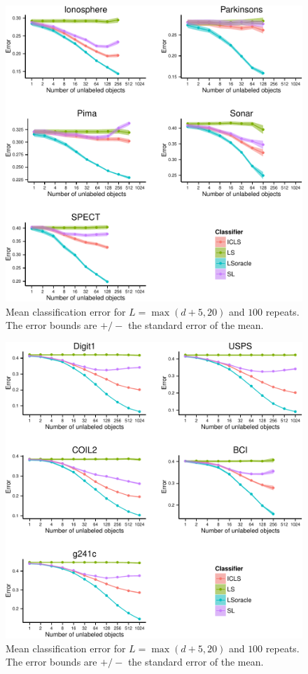 \documentclass{llncs}
\newcommand{\featdim}{d}
\newcommand{\Nlab}{L}
\begin{document}
\begin{figure}[ht!] 
  \centering
      \includegraphics[width=1.0\textwidth]{LearningCurves-1.pdf}
  \caption{Mean classification error for $\Nlab=\max(\featdim+5,20)$ and $100$ repeats. The error bounds are $+/-$ the standard error of the mean.} \label{fig:learningcurves1}
\end{figure}

\begin{figure}[ht!] 
  \centering
      \includegraphics[width=1.0\textwidth]{LearningCurves-2.pdf}
  \caption{Mean classification error for $\Nlab=\max(\featdim+5,20)$ and $100$ repeats. The error bounds are $+/-$ the standard error of the mean.} \label{fig:learningcurves2}
\end{figure}
\end{document}
